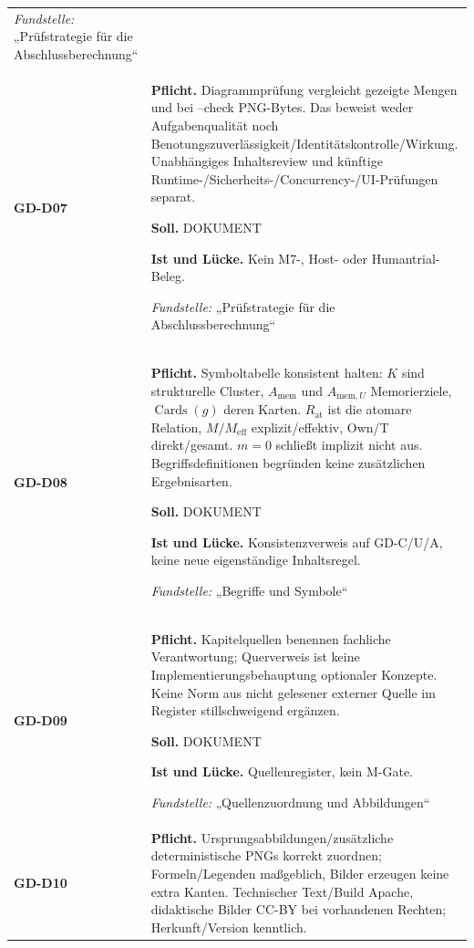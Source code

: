 \begin{longtable}{@{}P{20mm}P{128mm}@{}}
\emph{Fundstelle:} „Prüfstrategie für die Abschlussberechnung“\\\addlinespace[5pt]
\label{rule:GD-D07}\textbf{GD-D07} &
\textbf{Pflicht.} Diagrammprüfung vergleicht gezeigte Mengen und bei --check PNG-Bytes. Das beweist weder Aufgabenqualität noch Benotungszuverlässigkeit/Identitätskontrolle/Wirkung. Unabhängiges Inhaltsreview und künftige Runtime-/Sicherheits-/Concurrency-/UI-Prüfungen separat.\par\smallskip
\textbf{Soll.} DOKUMENT\par\smallskip
\textbf{Ist und Lücke.} Kein M7-, Host- oder Humantrial-Beleg.\par\smallskip
\emph{Fundstelle:} „Prüfstrategie für die Abschlussberechnung“\\\addlinespace[5pt]
\label{rule:GD-D08}\textbf{GD-D08} &
\textbf{Pflicht.} Symboltabelle konsistent halten: \(K\) sind strukturelle Cluster, \(A_{\mathrm{mem}}\) und \(A_{\mathrm{mem},U}\) Memorierziele, \(\operatorname{Cards}(g)\) deren Karten. \(R_{\mathrm{at}}\) ist die atomare Relation, \(M/M_{\mathrm{eff}}\) explizit/effektiv, Own/T direkt/gesamt. \(m=0\) schließt implizit nicht aus. Begriffsdefinitionen begründen keine zusätzlichen Ergebnisarten.\par\smallskip
\textbf{Soll.} DOKUMENT\par\smallskip
\textbf{Ist und Lücke.} Konsistenzverweis auf GD-C/U/A, keine neue eigenständige Inhaltsregel.\par\smallskip
\emph{Fundstelle:} „Begriffe und Symbole“\\\addlinespace[5pt]
\label{rule:GD-D09}\textbf{GD-D09} &
\textbf{Pflicht.} Kapitelquellen benennen fachliche Verantwortung; Querverweis ist keine Implementierungsbehauptung optionaler Konzepte. Keine Norm aus nicht gelesener externer Quelle im Register stillschweigend ergänzen.\par\smallskip
\textbf{Soll.} DOKUMENT\par\smallskip
\textbf{Ist und Lücke.} Quellenregister, kein M-Gate.\par\smallskip
\emph{Fundstelle:} „Quellenzuordnung und Abbildungen“\\\addlinespace[5pt]
\label{rule:GD-D10}\textbf{GD-D10} &
\textbf{Pflicht.} Ursprungsabbildungen/zusätzliche deterministische PNGs korrekt zuordnen; Formeln/Legenden maßgeblich, Bilder erzeugen keine extra Kanten. Technischer Text/Build Apache, didaktische Bilder CC-BY bei vorhandenen Rechten; Herkunft/Version kenntlich.\par\smallskip

\end{longtable}
